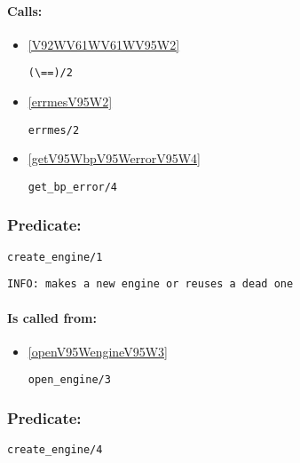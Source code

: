 \paragraph{Calls:} 
\begin{itemize}
\item \ref{V92WV61WV61WV95W2} 
\begin{verbatim}
(\==)/2
\end{verbatim}

\item \ref{errmesV95W2} 
\begin{verbatim}
errmes/2
\end{verbatim}

\item \ref{getV95WbpV95WerrorV95W4} 
\begin{verbatim}
get_bp_error/4
\end{verbatim}

\end{itemize}

\subsubsection{Predicate:} \label{createV95WengineV95W1}

\begin{verbatim}
create_engine/1
\end{verbatim}

{\small \begin{verbatim}
INFO: makes a new engine or reuses a dead one

\end{verbatim}}
\paragraph{Is called from:} 
\begin{itemize}
\item \ref{openV95WengineV95W3} 
\begin{verbatim}
open_engine/3
\end{verbatim}

\end{itemize}

\subsubsection{Predicate:} \label{createV95WengineV95W4}

\begin{verbatim}
create_engine/4
\end{verbatim}

